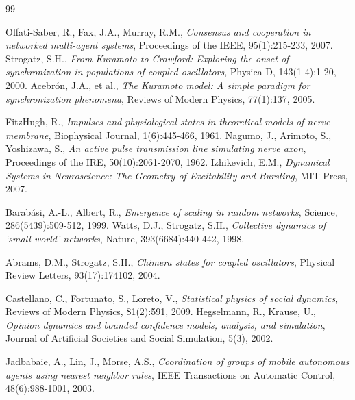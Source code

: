 \documentclass[11pt]{article}
\begin{document}
\begin{thebibliography}{99}

 Olfati-Saber, R., Fax, J.A., Murray, R.M., \emph{Consensus and cooperation in networked multi-agent systems}, Proceedings of the IEEE, 95(1):215-233, 2007.
 Strogatz, S.H., \emph{From Kuramoto to Crawford: Exploring the onset of synchronization in populations of coupled oscillators}, Physica D, 143(1-4):1-20, 2000.
 Acebr\'on, J.A., et al., \emph{The Kuramoto model: A simple paradigm for synchronization phenomena}, Reviews of Modern Physics, 77(1):137, 2005.

 FitzHugh, R., \emph{Impulses and physiological states in theoretical models of nerve membrane}, Biophysical Journal, 1(6):445-466, 1961.
 Nagumo, J., Arimoto, S., Yoshizawa, S., \emph{An active pulse transmission line simulating nerve axon}, Proceedings of the IRE, 50(10):2061-2070, 1962.
 Izhikevich, E.M., \emph{Dynamical Systems in Neuroscience: The Geometry of Excitability and Bursting}, MIT Press, 2007.

 Barab\'asi, A.-L., Albert, R., \emph{Emergence of scaling in random networks}, Science, 286(5439):509-512, 1999.
 Watts, D.J., Strogatz, S.H., \emph{Collective dynamics of `small-world' networks}, Nature, 393(6684):440-442, 1998.

 Abrams, D.M., Strogatz, S.H., \emph{Chimera states for coupled oscillators}, Physical Review Letters, 93(17):174102, 2004.

 Castellano, C., Fortunato, S., Loreto, V., \emph{Statistical physics of social dynamics}, Reviews of Modern Physics, 81(2):591, 2009.
 Hegselmann, R., Krause, U., \emph{Opinion dynamics and bounded confidence models, analysis, and simulation}, Journal of Artificial Societies and Social Simulation, 5(3), 2002.

 Jadbabaie, A., Lin, J., Morse, A.S., \emph{Coordination of groups of mobile autonomous agents using nearest neighbor rules}, IEEE Transactions on Automatic Control, 48(6):988-1001, 2003.


\end{thebibliography}
\end{document}
